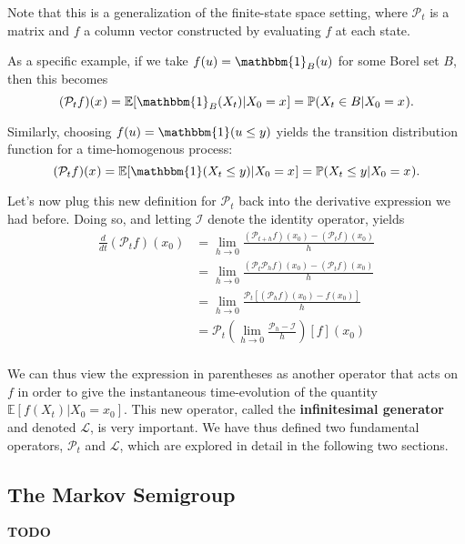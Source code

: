 \documentclass[12pt]{article}
\newcommand{\E}{\mathbb{E}}
\newcommand{\Prob}{\mathbb{P}}
\newcommand{\state}[1][t]{X_{#1}}
\newcommand{\stateValue}[1][t]{x_{#1}}
\newcommand{\op}[1][t]{\mathcal{P}_{#1}} %
\newcommand{\opId}{\mathcal{I}} %
\newcommand{\gen}{\mathcal{L}} %
\begin{document}
Note that this is a generalization of the finite-state space setting, where $\op$ is a matrix and $f$ a column vector constructed by evaluating $f$ at each state. 

As a specific example, if we take $f(u) = \mathbbm{1}_B(u)$ for some Borel set $B$, then this becomes 
\[
(\op f)(\stateValue[]) = \E[\mathbbm{1}_B(\state) | \state[0] = \stateValue[]] = \Prob(\state \in B | \state[0] = \stateValue[]).
\]

Similarly, choosing $f(u) = \mathbbm{1}(u \leq y)$ yields the transition distribution function for a time-homogenous process:
\[
(\op f)(\stateValue[]) = \E[\mathbbm{1}(\state \leq y) | \state[0] = \stateValue[]] = \Prob(\state \leq y | \state[0] = \stateValue[]).
\]

Let's now plug this new definition for $\op$ back into the derivative expression we had before. Doing so, and letting $\opId$ denote the identity operator, yields 
\begin{align*}
\frac{d}{dt} (\op f)(\stateValue[0]) 
&= \lim_{h \to 0} \frac{(\op[t+h] f)(\stateValue[0]) - (\op[t] f)(\stateValue[0])}{h} \\
&= \lim_{h \to 0} \frac{(\op[t]\op[h] f)(\stateValue[0]) - (\op[t] f)(\stateValue[0])}{h} \\
&= \lim_{h \to 0} \frac{\op[t] \left[(\op[h] f)(\stateValue[0]) - f(\stateValue[0])\right]}{h} \\
&= \op[t] \left(\lim_{h \to 0} \frac{\op[h] - \opId}{h}\right)[f](x_0) \\
\end{align*}

We can thus view the expression in parentheses as another operator that acts on $f$ in order to give the instantaneous time-evolution of the quantity 
$\E[f(\state) | \state[0] = \stateValue[0]]$. This new operator, called the \textbf{infinitesimal generator} and denoted $\gen$, is very important. We have thus defined 
two fundamental operators, $\op$ and $\gen$, which are explored in detail in the following two sections. 

\subsection{The Markov Semigroup}
\textbf{TODO} 

\end{document}
